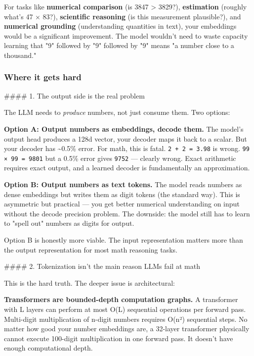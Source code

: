 \documentclass[11pt]{article}
\begin{document}
For tasks like \textbf{numerical comparison} (is 3847 > 3829?), \textbf{estimation} (roughly what's 47 × 83?), \textbf{scientific reasoning} (is this measurement plausible?), and \textbf{numerical grounding} (understanding quantities in text), your embeddings would be a significant improvement. The model wouldn't need to waste capacity learning that "9" followed by "9" followed by "9" means "a number close to a thousand."


\subsubsection*{Where it gets hard}


\#\#\#\# 1. The output side is the real problem


The LLM needs to \emph{produce} numbers, not just consume them. Two options:


\textbf{Option A: Output numbers as embeddings, decode them.} The model's output head produces a 128d vector, your decoder maps it back to a scalar. But your decoder has \textasciitilde{}0.5\% error. For math, this is fatal. \texttt{2 + 2 = 3.98} is wrong. \texttt{99 × 99 = 9801} but a 0.5\% error gives \texttt{9752} — clearly wrong. Exact arithmetic requires exact output, and a learned decoder is fundamentally an approximation.


\textbf{Option B: Output numbers as text tokens.} The model reads numbers as dense embeddings but writes them as digit tokens (the standard way). This is asymmetric but practical — you get better numerical understanding on input without the decode precision problem. The downside: the model still has to learn to "spell out" numbers as digits for output.


Option B is honestly more viable. The input representation matters more than the output representation for most math reasoning tasks.


\#\#\#\# 2. Tokenization isn't the main reason LLMs fail at math


This is the hard truth. The deeper issue is architectural:


\textbf{Transformers are bounded-depth computation graphs.} A transformer with L layers can perform at most O(L) sequential operations per forward pass. Multi-digit multiplication of n-digit numbers requires O(n²) sequential steps. No matter how good your number embeddings are, a 32-layer transformer physically cannot execute 100-digit multiplication in one forward pass. It doesn't have enough computational depth.
\end{document}
